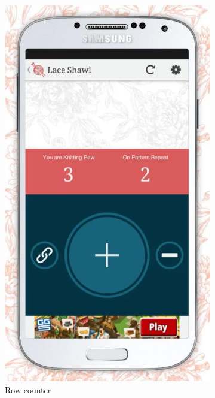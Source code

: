 \begin{figure}[H]
  \centering
    \begin{subfigure}[b]{0.33\textwidth}
      \centering
        \includegraphics[width=0.95\linewidth]{images/image10.png}
        \caption[Row counter ]{Row counter}
      \label{fig:knit_tink_row_counter}
    \end{subfigure}
    \begin{subfigure}[b]{0.33\textwidth}

\end{subfigure}
\end{figure}
